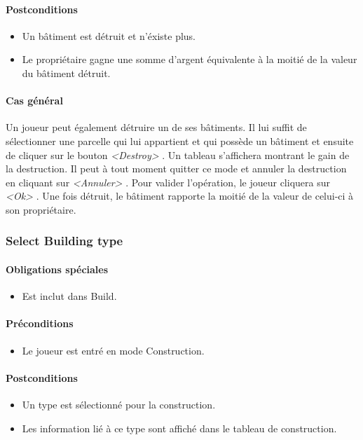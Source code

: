 \documentclass[a4paper,11pt]{report}
\begin{document}
\paragraph{Postconditions}
\begin{itemize}
 \item Un bâtiment est détruit et n'éxiste plus.
 \item Le propriétaire gagne une somme d'argent équivalente à la moitié de la valeur du bâtiment détruit.
\end{itemize}
\paragraph{Cas général}
Un joueur peut également détruire un de ses bâtiments. Il lui suffit de sélectionner une parcelle qui lui appartient et qui possède un bâtiment et ensuite de cliquer sur le bouton \og \textit{<Destroy>} \fg. Un tableau s'affichera montrant le gain de la destruction. Il peut à tout moment quitter ce mode et annuler la destruction en cliquant sur \og \textit{<Annuler>} \fg. Pour valider l'opération, le joueur cliquera sur \og \textit{<Ok>} \fg. Une fois détruit, le bâtiment rapporte la moitié de la valeur de celui-ci à son propriétaire.
\newpage
\subsubsection{Select Building type}
\paragraph{Obligations spéciales}
\begin{itemize}
 \item Est inclut dans Build.
\end{itemize}
\paragraph{Préconditions}
\begin{itemize}
 \item Le joueur est entré en mode Construction.
\end{itemize}
\paragraph{Postconditions}
\begin{itemize}
 \item Un type est sélectionné pour la construction.
 \item Les information lié à ce type sont affiché dans le tableau de construction.
\end{itemize}
\end{document}
